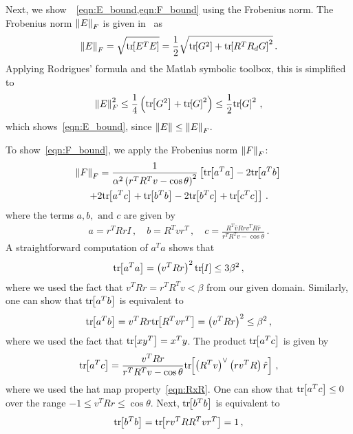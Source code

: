 \documentclass[letterpaper, 10 pt, conference]{ieeeconf}  %
\begin{document}
	Next, we show~~\cref{eqn:E_bound,eqn:F_bound} using the Frobenius norm.
	The Frobenius norm \( \left\| E \right\|_F \) is given in~\cite{lee2011a} as
	\begin{gather*}
		\left\| E \right\|_F = \sqrt{\mathrm{tr}\negthickspace\left[ E^T E \right]} = \frac{1}{2} \sqrt{\mathrm{tr}\negthickspace\left[ G^2 \right] + \mathrm{tr}\negthickspace\left[ R^T R_d G \right]^2} \, .
	\end{gather*}
	Applying Rodrigues' formula and the Matlab symbolic toolbox, this is simplified to
	\begin{gather*}
		\left\| E \right\|^2_F \leq \frac{1}{4} \left( \mathrm{tr}\negthickspace\left[ G^2 \right] + \mathrm{tr}\negthickspace\left[ G \right]^2 \right) \leq \frac{1}{2} \mathrm{tr}\negthickspace\left[ G \right]^2 \, ,
	\end{gather*}
	which shows~\cref{eqn:E_bound}, since \( \left\| E \right\| \leq \left\| E \right\|_F \).
	
	To show~\cref{eqn:F_bound}, we apply the Frobenius norm \( \left\| F \right\|_F \):
	\begin{gather*}
		\left\| F \right\|_F = \frac{1}{\alpha ^2 \left( r^T R^T v - \cos \theta \right)^2} \left[\mathrm{tr}\negthickspace\left[ a^T a \right] - 2 \mathrm{tr}\negthickspace\left[ a^T b \right] \right. \\
		\left.+ 2 \mathrm{tr}\negthickspace\left[ a^T c  \right] + \mathrm{tr}\negthickspace\left[ b^T b \right]  - 2 \mathrm{tr}\negthickspace\left[ b^T c \right] + \mathrm{tr}\negthickspace\left[ c^T c \right]\right] \, .
	\end{gather*}
	where the terms \( a, b, \text{ and } c \) are given by
	\begin{gather*}
		a = r^T R r I \, , \quad	b = R^T v r^T \, , \quad c = \frac{R^T \hat{v} R r v^T R \hat{r}}{r^T R^T v - \cos \theta}\, .
	\end{gather*}
	A straightforward computation of \( a^T a \) shows that
	\begin{gather*}
		\mathrm{tr}\negthickspace\left[ a^T a \right] = \left( v^T R r \right)^2 \mathrm{tr}\negthickspace\left[ I \right] \leq 3 \beta^2 \, ,
	\end{gather*}
	where we used the fact that \( v^T R r = r^T R^T v < \beta \) from our given domain.
	Similarly, one can show that \( \mathrm{tr}\negthickspace\left[ a^T b \right] \) is equivalent to
	\begin{gather*}
		\mathrm{tr}\negthickspace\left[ a^T b \right] = v^T R r \mathrm{tr}\negthickspace\left[ R^T v r^T \right] = \left( v^T R r \right)^2 \leq \beta^2 \, ,
	\end{gather*} 
	where we used the fact that \( \mathrm{tr}\negthickspace\left[ x y^T \right] = x^T y \).
	The product \( \mathrm{tr}\negthickspace\left[ a^T c \right] \) is given by
	\begin{gather*}
		\mathrm{tr}\negthickspace\left[ a^T c \right] = \frac{v^T R r}{r^T R^T v - \cos \theta} \mathrm{tr}\negthickspace\left[ \left( R^T v \right)^\vee \left( r v^T R \right) \hat{r}  \right] \, ,
	\end{gather*}
	where we used the hat map property~\cref{eqn:RxR}.
	One can show that \(\mathrm{tr}\negthickspace\left[ a^T c \right] \leq 0 \) over the range \( -1 \leq v^T R r \leq \cos \theta \). 
	Next, \( \mathrm{tr}\negthickspace\left[ b^T b \right]\) is equivalent to
	\begin{gather*}
		\mathrm{tr}\negthickspace\left[ b^T b \right] = \mathrm{tr}\negthickspace\left[ r v^T R R^T v r^T \right] = 1 \, ,
	\end{gather*}
\end{document}

